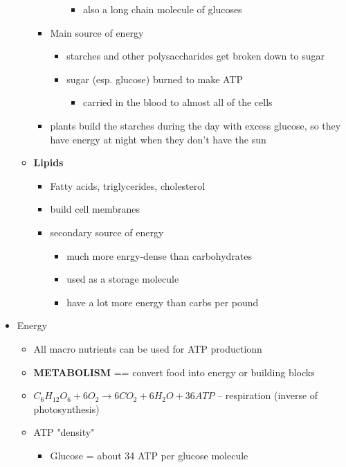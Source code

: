 \documentclass{article}
\theoremstyle{definition}
\begin{document}
\begin{itemize}
\begin{itemize}
\begin{itemize}
\begin{itemize}
\begin{itemize}
									\item also a long chain molecule of glucoses
								\end{itemize}
						\end{itemize}
					\item Main source of energy
						\begin{itemize}
							\item starches and other polysaccharides get broken down to sugar
							\item sugar (esp. glucose) burned to make ATP
								\begin{itemize}
									\item carried in the blood to almost all of the cells
								\end{itemize}
						\end{itemize}
					\item plants build the starches during the day with excess glucose, so they have energy at night when they don't have the sun
				\end{itemize}
			\item \textbf{Lipids} 
				\begin{itemize}
					\item Fatty acids, triglycerides, cholesterol
					\item build cell membranes
					\item secondary source of energy
						\begin{itemize}
							\item much more enrgy-dense than carbohydrates
							\item used as a storage molecule
							\item have a lot more energy than carbs per pound
						\end{itemize}
				\end{itemize}
		\end{itemize}
	\item Energy
		\begin{itemize}
			\item All macro nutrients can be used for ATP productionn
			\item \textbf{METABOLISM} == convert food into energy or building blocks
			\item $C_6H_{12}O_6 + 6O_2 \to 6CO_2 + 6H_2O + 36ATP$ -- respiration (inverse of photosynthesis)
			\item ATP "density"
				\begin{itemize}
					\item Glucose = about 34 ATP per glucose molecule

\end{itemize}
\end{itemize}
\end{itemize}
\end{document}
